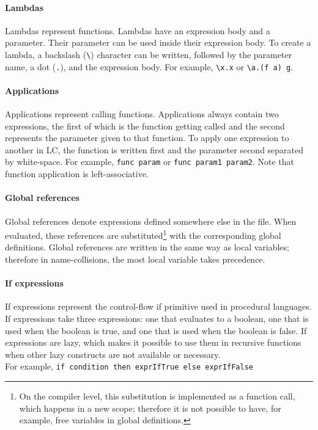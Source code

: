 \documentclass[12pt]{article}
\begin{document}
\paragraph{Lambdas} Lambdas represent functions. Lambdas have an expression
body and a parameter. Their parameter can be used inside their expression
body. To create a lambda, a backslash (\verb$\$) character can be written,
followed by the parameter name, a dot (\verb$.$), and the expression body. For
example, \verb$\x.x$ or \verb$\a.(f a) g$.

\paragraph{Applications} Applications represent calling functions. Applications
always contain two expressions, the first of which is the function getting
called and the second represents the parameter given to that function. To apply
one expression to another in LC, the function is written first and the parameter
second separated by white-space. For example, \verb$func param$ or 
\verb$func param1 param2$.
\noindent
Note that function application is left-associative.

\paragraph{Global references} Global references denote expressions defined
somewhere else in the file. When evaluated, these references are
substituted\footnote{On the compiler level, this substitution is implemented as
    a function call, which happens in a new scope; therefore it is not possible
to have, for example, free variables in global definitions.} with the
corresponding global definitions. Global references are written in the same way
as local variables; therefore in name-collisions, the most local variable takes
precedence.

\paragraph{If expressions} If expressions represent the control-flow if
primitive used in procedural languages. If expressions take three expressions:
one that evaluates to a boolean, one that is used when the boolean is true, and
one that is used when the boolean is false. If expressions are lazy, which makes
it possible to use them in recursive functions when other lazy constructs are
not available or necessary. \\
For example, \verb$if condition then exprIfTrue else exprIfFalse$
\end{document}
